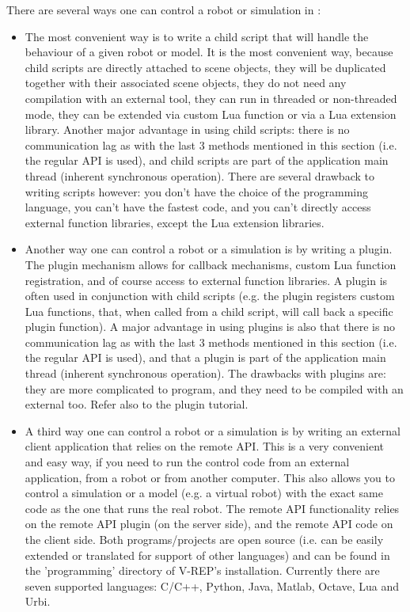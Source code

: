 \label{excontroller}\secdown


There are several ways one can control a robot or simulation in \vrep:

\begin{itemize}

\item The most convenient way is to write a child script that will handle the
	behaviour of a given robot or model. It is the most convenient way, 
	because child scripts are directly attached to scene objects, they will 
	be duplicated together with their associated scene objects, they do not 
	need any compilation with an external tool, they can run in threaded or 
	non-threaded mode, they can be extended via custom Lua function or via 
	a Lua extension library. Another major advantage in using child scripts:
	there is no communication lag as with the last 3 methods mentioned in 
	this section (i.e. the regular API is used), and child scripts are part
	of the application main thread (inherent synchronous operation). There 
	are several drawback to writing scripts however: you don't have the 
	choice of the programming language, you can't have the fastest code, 
	and you can't directly access external function libraries, except the
	Lua extension libraries.

\item Another way one can control a robot or a simulation is by writing a 
	plugin. The plugin mechanism allows for callback mechanisms, custom Lua
	function registration, and of course access to external function 
	libraries. A plugin is often used in conjunction with child scripts 
	(e.g. the plugin registers custom Lua functions, that, when called from 
	a child script, will call back a specific plugin function). A major
	advantage in using plugins is also that there is no communication lag 
	as with the last 3 methods mentioned in this section (i.e. the regular 
	API is used), and that a plugin is part of the application main thread 
	(inherent synchronous operation). The drawbacks with plugins are: they
	are more complicated to program, and they need to be compiled with an
	external too. Refer also to the plugin tutorial.

\item A third way one can control a robot or a simulation is by writing an 
	external client application that relies on the remote API. This is a 
	very convenient and easy way, if you need to run the control code from
	an external application, from a robot or from another computer. This 
	also allows you to control a simulation or a model (e.g. a virtual 
	robot) with the exact same code as the one that runs the real robot. 
	The remote API functionality relies on the remote API plugin (on the 
	server side), and the remote API code on the client side. Both 
	programs/projects are open source (i.e. can be easily extended or
	translated for support of other languages) and can be found in the 
	'programming' directory of V-REP's installation. Currently there are 
	seven supported languages: C/C++, Python, Java, Matlab, Octave, 
	Lua and Urbi.


\end{itemize}
